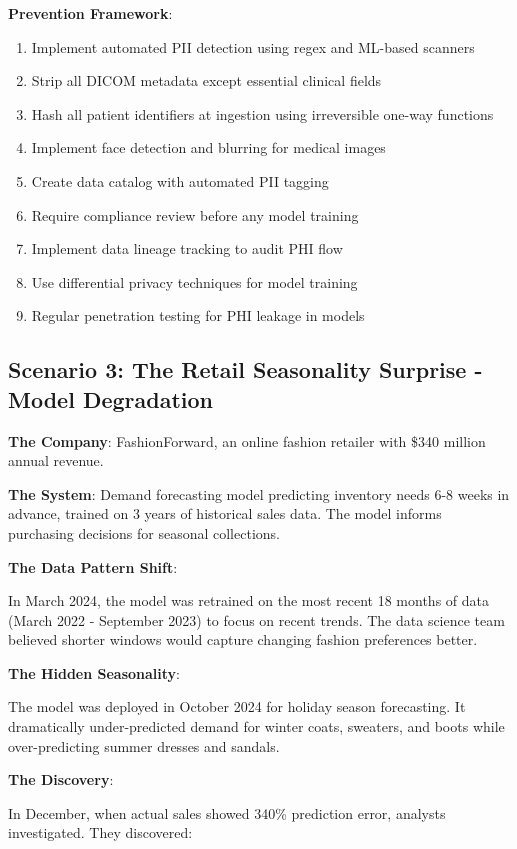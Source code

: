 \textbf{Prevention Framework}:
\begin{enumerate}
    \item Implement automated PII detection using regex and ML-based scanners
    \item Strip all DICOM metadata except essential clinical fields
    \item Hash all patient identifiers at ingestion using irreversible one-way functions
    \item Implement face detection and blurring for medical images
    \item Create data catalog with automated PII tagging
    \item Require compliance review before any model training
    \item Implement data lineage tracking to audit PHI flow
    \item Use differential privacy techniques for model training
    \item Regular penetration testing for PHI leakage in models
\end{enumerate}

\subsection{Scenario 3: The Retail Seasonality Surprise - Model Degradation}

\textbf{The Company}: FashionForward, an online fashion retailer with \$340 million annual revenue.

\textbf{The System}: Demand forecasting model predicting inventory needs 6-8 weeks in advance, trained on 3 years of historical sales data. The model informs purchasing decisions for seasonal collections.

\textbf{The Data Pattern Shift}:

In March 2024, the model was retrained on the most recent 18 months of data (March 2022 - September 2023) to focus on recent trends. The data science team believed shorter windows would capture changing fashion preferences better.

\textbf{The Hidden Seasonality}:

The model was deployed in October 2024 for holiday season forecasting. It dramatically under-predicted demand for winter coats, sweaters, and boots while over-predicting summer dresses and sandals.

\textbf{The Discovery}:

In December, when actual sales showed 340\% prediction error, analysts investigated. They discovered:


